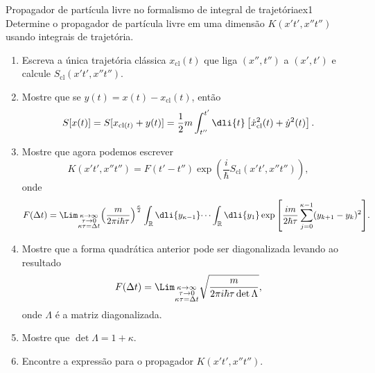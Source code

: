\begin{exercício}{Propagador de partícula livre no formalismo de integral de trajetória}{ex1}
    Determine o propagador de partícula livre em uma dimensão \(K(x't', x''t'')\) usando integrais de trajetória.
    \begin{enumerate}[label=(\alph*)]
       \item Escreva a única trajetória clássica \(x_{\mathrm{cl}}(t)\) que liga \((x'',t'')\) a \((x',t')\) e calcule \(S_{\mathrm{cl}}(x't',x''t'').\)
       \item Mostre que se \(y(t) = x(t) - x_{\mathrm{cl}}(t)\), então
          \begin{equation*}
             S[x(t)] = S[x_{\mathrm{cl}(t)} + y(t)] = \frac12m\int_{t''}^{t'} \dli{t} \left[\dot{x}_{\mathrm{cl}}^2(t) + \dot{y}^2(t)\right].
          \end{equation*}
       \item Mostre que agora podemos escrever
          \begin{equation*}
             K(x't', x''t'') = F(t' - t'') \exp\left(\frac{i}{\hbar} S_{\mathrm{cl}}(x't', x''t'')\right),
          \end{equation*}
          onde
          \begin{equation*}
             F(\Delta t) = \Lim_{\substack{\kappa \to \infty\\ \tau \to 0\\ \kappa \tau = \Delta t}}{\left(\frac{m}{2\pi i \hbar \tau}\right)^{\frac\kappa2}\int_{\mathbb{R}} \dli{y_{\kappa - 1}} \dots \int_{\mathbb{R}} \dli{y_1} \exp\left[\frac{im}{2 \hbar \tau} \sum_{j = 0}^{\kappa - 1}(y_{k+1} - y_k)^2\right]}.
          \end{equation*}
       \item Mostre que a forma quadrática anterior pode ser diagonalizada levando ao resultado
          \begin{equation*}
             F(\Delta t) = \Lim_{\substack{\kappa \to \infty\\ \tau \to 0\\ \kappa \tau = \Delta t}} \sqrt{\frac{m}{2\pi i \hbar \tau \det \Lambda}},
          \end{equation*}
          onde \(\Lambda\) é a matriz diagonalizada.
       \item Mostre que \(\det \Lambda = 1 + \kappa.\)
       \item Encontre a expressão para o propagador \(K(x't', x''t'').\)
    \end{enumerate}
\end{exercício}
